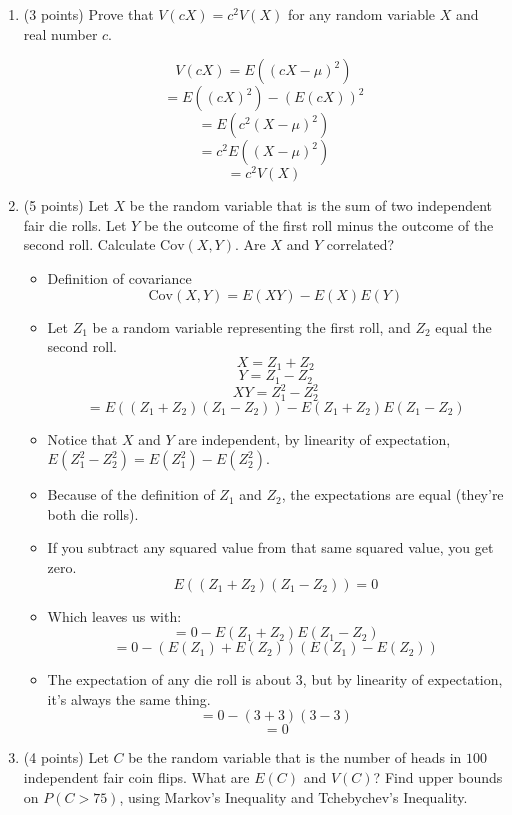 \documentclass[11pt]{article}
\begin{document}
\begin{enumerate}
\begin{itemize}
	\end{itemize}

\item (3 points) Prove that $V(cX) = c^2 V(X)$ for any random variable $X$ and
real number $c$.

	\[ V(cX) = E((cX - \mu)^2) \]
	\[ = E((cX)^2) - (E(cX))^2\]
	\[ = E(c^2(X - \mu)^2)\]
	\[ = c^2 E((X - \mu)^2)\]
	\[ = c^2 V(X) \]

\item (5 points) Let $X$ be the random variable that is the sum of two
independent fair die rolls.  Let $Y$ be the outcome of the first roll minus the
outcome of the second roll.  Calculate $\mathrm{Cov}(X,Y)$.
Are $X$ and $Y$ correlated?

\begin{itemize}
	
	\item Definition of covariance
         \[ \mathrm{Cov}(X,Y) = E(XY) - E(X)E(Y)\]
   \item Let $Z_1$ be a random variable representing the first roll, and $Z_2$ equal the second roll.
         \[ X = Z_1 + Z_2 \]
         \[ Y = Z_1 - Z_2 \]
         \[ XY = Z_1^2 - Z_2^2 \]
         \[ = E((Z_1 + Z_2)(Z_1 - Z_2)) - E(Z_1 + Z_2)E(Z_1 - Z_2) \]
   \item Notice that $X$ and $Y$ are independent, by linearity of expectation, $E(Z_1^2 - Z_2^2) = E(Z_1^2) - E(Z_2^2)$.
   \item Because of the definition of $Z_1$ and $Z_2$, the expectations are equal (they're both die rolls).
   \item If you subtract any squared value from that same squared value, you get zero.
         \[ E((Z_1 + Z_2)(Z_1 - Z_2)) = 0 \]
   \item Which leaves us with:
         \[ = 0- E(Z_1 + Z_2)E(Z_1 - Z_2)\]
         \[ = 0- (E(Z_1) + E(Z_2))(E(Z_1) - E(Z_2))\]
   \item The expectation of any die roll is about 3, but by linearity of expectation, it's always the same thing.
         \[ =0 - (3 + 3)(3 - 3)\]
         \[ = 0\]
         
\end{itemize}

\item (4 points) Let $C$ be the random variable that is the number of heads in
$100$ independent fair coin flips.  What are $E(C)$ and $V(C)$?  Find upper
bounds on $P(C > 75)$, using Markov's Inequality and Tchebychev's Inequality.


\end{enumerate}
\end{document}
